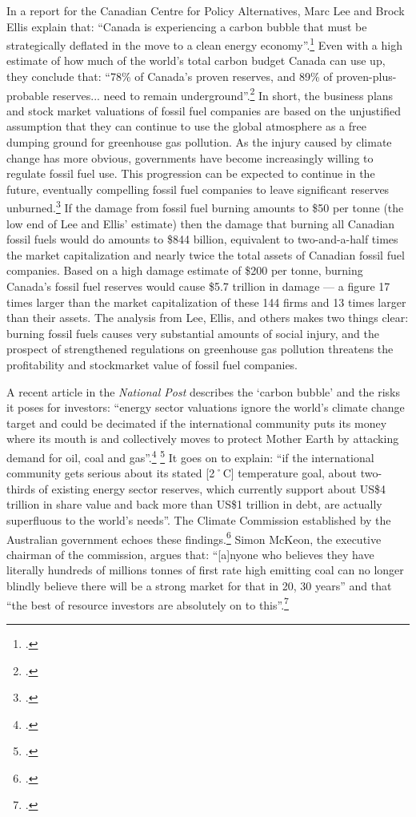 In a report for the Canadian Centre for Policy Alternatives, Marc Lee and Brock Ellis explain that: ``Canada is experiencing a carbon bubble that must be strategically deflated in the move to a clean energy economy''.\footcite[][p.5]{CanadaCarbonLiabilities}
Even with a high estimate of how much of the world's total carbon budget Canada can use up, they conclude that: ``78\% of Canada’s proven reserves, and 89\% of proven-plus- probable reserves... need to remain underground''.\footcite[][p.6]{CanadaCarbonLiabilities}
In short, the business plans and stock market valuations of fossil fuel companies are based on the unjustified assumption that they can continue to use the global atmosphere as a free dumping ground for greenhouse gas pollution.
As the injury caused by climate change has more obvious, governments have become increasingly willing to regulate fossil fuel use.
This progression can be expected to continue in the future, eventually compelling fossil fuel companies to leave significant reserves unburned.\footcite[See, for instance: ][]{ThreatenGrowth}
If the damage from fossil fuel burning amounts to \$50 per tonne (the low end of Lee and Ellis' estimate) then the damage that burning all Canadian fossil fuels would do amounts to \$844 billion, equivalent to two-and-a-half times the market capitalization and nearly twice the total assets of Canadian fossil fuel companies.
Based on a high damage estimate of \$200 per tonne, burning Canada's fossil fuel reserves would cause \$5.7 trillion in damage --- a figure 17 times larger than the market capitalization of these 144 firms and 13 times larger than their assets.
The analysis from Lee, Ellis, and others makes two things clear: burning fossil fuels causes very substantial amounts of social injury, and the prospect of strengthened regulations on greenhouse gas pollution threatens the profitability and stockmarket value of fossil fuel companies.



A recent article in the \emph{National Post} describes the `carbon bubble' and the risks it poses for investors: ``energy sector valuations ignore the world's climate change target and could be decimated if the international community puts its money where its mouth is and collectively moves to protect Mother Earth by attacking demand for oil, coal and gas''.\footcite[][]{OilGiantsMajorPain} \footcite[See also: ][]{TimelyIssue}
It goes on to explain: ``if the international community gets serious about its stated [2˚C] temperature goal, about two-thirds of existing energy sector reserves, which currently support about US\$4 trillion in share value and back more than US\$1 trillion in debt, are actually superfluous to the world's needs''.
The Climate Commission established by the Australian government echoes these findings.\footcite[][]{CriticalDecade2013}
Simon McKeon, the executive chairman of the commission, argues that: ``[a]nyone who believes they have literally hundreds of millions tonnes of first rate high emitting  coal can no longer blindly believe there will be a strong market for that in 20, 30 years'' and that ``the best of resource investors are absolutely on to this''.\footcite[][]{CoalWillBeLeft}




